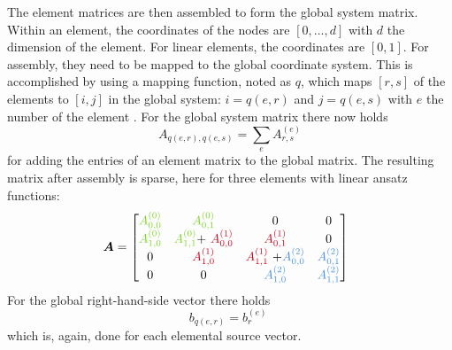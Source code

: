 \documentclass[%
  a4paper,oneside,%
  11pt,%
  smallchapters,
  style=printdev,
  extramargin,
  green,%
  rgb, <cmyk>
  ]{tubsbook}
\begin{document}
The element matrices are then assembled to form the global system matrix. Within an element, the coordinates of the nodes are $[0,...,d]$ with $d$ the dimension of the element. For linear elements, the coordinates are $[0,1]$. For assembly, they need to be mapped to the global coordinate system. This is accomplished by using a mapping function, noted as $q$, which maps $[r,s]$ of the elements to $[i,j]$ in the global system: $i=q(e,r)$ and $j = q(e,s)$ with $e$ the number of the element \cite{langtangen2019}. For the global system matrix there now holds
\begin{equation}
A_{q(e,r), q(e,s)} =  \sum_e A_{r,s}^{(e)}
\label{eqn:SysMatAssem}
\end{equation}
for adding the entries of an element matrix to the global matrix.
The resulting matrix after assembly is sparse, here for three elements with linear ansatz functions:
\begin{equation}
\bm{A}  =
\begin{bmatrix}
\textcolor[rgb]{0.49,0.83,0.13}{A_{0,0}^{( 0)}} & \textcolor[rgb]{0.49,0.83,0.13}{A}\textcolor[rgb]{0.49,0.83,0.13}{_{0,1}^{( 0)}} & 0 & 0\\
\textcolor[rgb]{0.49,0.83,0.13}{A}\textcolor[rgb]{0.49,0.83,0.13}{_{1,0}^{( 0)}} & \textcolor[rgb]{0.49,0.83,0.13}{A}\textcolor[rgb]{0.49,0.83,0.13}{_{1,1}^{( 0)}}\textcolor[rgb]{0,0,0}{+}\textcolor[rgb]{0.49,0.83,0.13}{\ }\textcolor[rgb]{0.82,0.01,0.11}{A_{0,0}^{( 1)}} & \textcolor[rgb]{0.82,0.01,0.11}{A}\textcolor[rgb]{0.82,0.01,0.11}{_{0,1}^{( 1)}} & 0\\
0 & \textcolor[rgb]{0.82,0.01,0.11}{A}\textcolor[rgb]{0.82,0.01,0.11}{_{1,0}^{( 1)}} & \textcolor[rgb]{0.82,0.01,0.11}{A}\textcolor[rgb]{0.82,0.01,0.11}{_{1,1}^{( 1)} \ }\textcolor[rgb]{0,0,0}{+}\textcolor[rgb]{0.29,0.56,0.89}{A_{0,0}^{( 2)}} & \textcolor[rgb]{0.29,0.56,0.89}{A}\textcolor[rgb]{0.29,0.56,0.89}{_{0,1}^{( 2)}}\\
0 & 0 & \textcolor[rgb]{0.29,0.56,0.89}{A}\textcolor[rgb]{0.29,0.56,0.89}{_{1,0}^{( 2)}} & \textcolor[rgb]{0.29,0.56,0.89}{A}\textcolor[rgb]{0.29,0.56,0.89}{_{1,1}^{( 2)}}
\end{bmatrix} \ \ 
\label{eqn:Assembly}
\end{equation}
%
For the global right-hand-side vector there holds
\begin{equation}
b_{q(e,r)} = b_r^{(e)} \; 
\end{equation}
which is, again, done for each elemental source vector.
\end{document}
